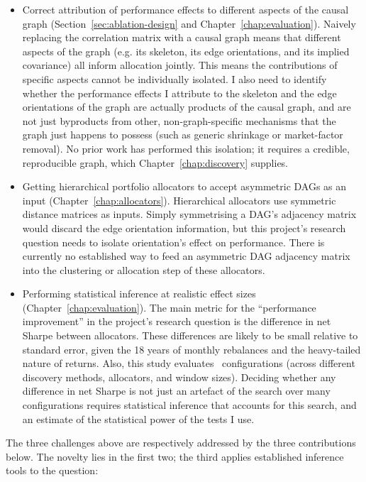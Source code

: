 \documentclass[11pt, a4paper]{report}
\begin{document}
\begin{itemize}[itemsep=2pt, topsep=3pt]
  \item Correct attribution of performance effects to different aspects of 
  the causal graph (Section~\ref{sec:ablation-design} and Chapter~\ref{chap:evaluation}). Naively replacing the
  correlation matrix with a causal graph means that different aspects
  of the graph (e.g. its skeleton, its edge orientations, and its
  implied covariance) all inform allocation jointly. This means
  the contributions of specific aspects cannot be individually isolated.
  I also need to identify whether the performance effects I attribute to
  the skeleton and the edge orientations of the graph are actually products
  of the causal graph, and are not just byproducts from other, non-graph-specific mechanisms that the graph just happens to possess
  (such as generic shrinkage or market-factor removal).
  No prior work has performed this isolation; it requires a credible,
  reproducible graph, which Chapter~\ref{chap:discovery} supplies. 
  \item Getting hierarchical portfolio allocators to accept 
  asymmetric DAGs as
  an input (Chapter~\ref{chap:allocators}). Hierarchical allocators
  use symmetric distance matrices as inputs. Simply symmetrising
  a DAG's adjacency matrix would discard the edge orientation information, but this project's research question needs to isolate orientation's effect on performance. There is currently no established way to feed
  an asymmetric DAG adjacency matrix into the clustering or allocation step of these allocators.
  \item Performing statistical inference at realistic effect sizes
    (Chapter~\ref{chap:evaluation}). The main metric for the ``performance improvement'' in the project's research question is the
    difference in net Sharpe between allocators. These differences are
    likely to be small relative to standard error, given the 18 years of
    monthly rebalances and the heavy-tailed nature of returns. Also, this
    study evaluates \rsNtrials\ configurations (across different discovery methods, allocators, and window sizes). Deciding whether any
    difference in net Sharpe is not just an artefact
    of the search over many configurations requires statistical inference
    that accounts for this search, and an estimate of the statistical power of the tests I use. 
\end{itemize}

\noindent The three challenges above are respectively addressed by the three
contributions below. The novelty lies in the first two; the third applies
established inference tools to the question:
\end{document}
